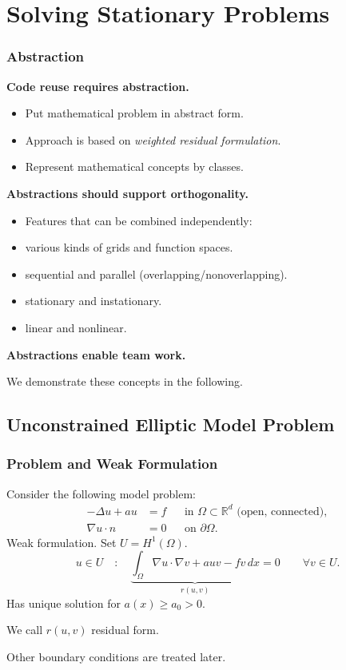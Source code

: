 \section{Solving Stationary Problems}\label{Sec:EllipticProblems}

\begin{frame}
\frametitle<presentation>{Abstraction}
\textbf{Code reuse requires abstraction.}
\begin{itemize}
\item Put mathematical problem in abstract form.
\item Approach is based on \textit{weighted residual formulation}.
\item Represent mathematical concepts by classes.
\end{itemize}
\textbf{Abstractions should support orthogonality.}
\begin{itemize}
\item Features that can be combined independently:
\item various kinds of grids and function spaces.
\item sequential and parallel (overlapping/nonoverlapping).
\item stationary and instationary.
\item linear and nonlinear.
\end{itemize}
\textbf{Abstractions enable team work.}

We demonstrate these concepts in the following.
\end{frame}

\subsection{Unconstrained Elliptic Model Problem}

\begin{frame}
\frametitle{Problem and Weak Formulation}
Consider the following model problem:
\begin{subequations} \label{Eq:Example01}
\begin{align*}
-\Delta u + a u &= f &&\text{in $\Omega\subset\mathbb{R}^d$ (open, connected)},\\
\nabla u \cdot n &= 0 &&\text{on $\partial\Omega$}.
\end{align*}
\end{subequations}
\medskip
Weak formulation. Set $U = H^1(\Omega)$.
\begin{equation*}
u\in U \quad : \quad \underbrace{\int_\Omega \nabla u \cdot \nabla v + 
a u v - f v \,dx}_{r(u,v)} = 0 \qquad \forall v\in U.
\end{equation*}
Has unique solution for $a(x)\geq a_0>0$.

We call $r(u,v)$ residual form.

Other boundary conditions are treated later.
\end{frame}

